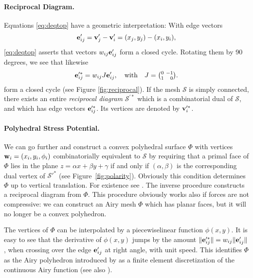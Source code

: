 \documentclass[annual]{acmsiggraph}
\def\SS{{\mathcal S}}
\begin{document}
\paragraph{Reciprocal Diagram.}

Equations \eqref{eq:deqtop} have a geometric interpretation: With edge 
vectors
	$${\mathbf e}'_{ij} = {\mathbf v}_j'-{\mathbf v}_i'=(x_j, y_j) - (x_i, y_i),
	$$
 \eqref{eq:deqtop} asserts that vectors $w_{ij} {\mathbf e}_{ij}'$ form a closed 
cycle. Rotating them by 90 degrees, we see that likewise
	$$
	{\mathbf e}_{ij}^{\prime *} = w_{ij} J {\mathbf e}_{ij}', \quad \text{with}\quad
	J={\textstyle{0 \ -1 \choose 1 \ \hphantom{-}0}}.
	$$
 form a closed cycle (see Figure \ref{fig:reciprocal}).
If the mesh $\SS$ is simply connected, there exists 
an entire {\em reciprocal diagram} $\SS^{\prime *}$ which is a 
combinatorial dual of $\SS$, and which has edge vectors ${\mathbf e}_{ij}'^*$.
 Its vertices are denoted by ${\mathbf v}_i^{\prime *}$.


\paragraph{Polyhedral Stress Potential.}

We can go further and construct a convex polyhedral surface $\Phi$ with 
vertices ${\mathbf w}_i=(x_i,y_i,\phi_i)$ combinatorially equivalent to $\SS$ by 
requiring that a primal face of $\Phi$ lies in the plane $z=\alpha x + 
\beta y + \gamma$ if and only if $(\alpha,\beta)$ is the corresponding 
dual vertex of $\SS'^*$ (see Figure~\ref{fig:polarity}). Obviously this 
condition determines $\Phi$ up to vertical translation. For existence see 
\cite{Ash1988}. The inverse procedure constructs a reciprocal diagram from 
$\Phi$. This procedure obviously works also if forces are not compressive: 
we can construct an Airy mesh $\Phi$ which has planar faces, but it will 
no longer be a convex polyhedron.

The vertices of $\Phi$ can be interpolated by a piecewise\dash linear 
function $\phi(x,y)$. It is easy to see that the derivative of $\phi(x,y)$ 
jumps by the amount $\|{\mathbf e}_{ij}'^*\| = w_{ij}\|{\mathbf e}_{ij}'\|$, when crossing 
over the edge ${\mathbf e}'_{ij}$ at right angle, with unit speed. This identifies 
$\Phi$ as the Airy polyhedron introduced by \cite{Fraternali2002a} as a 
finite element discretization of the continuous Airy function (see also 
\cite{Fraternali2010}).
\end{document}
